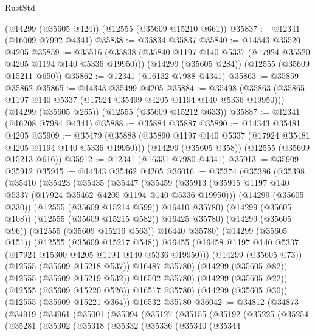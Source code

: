 \begin{lexlean}{RustStd}
\begin{coremodule}
    (@14299 (@35605 @424))
    (@12555 (@35609 @15210 @661))
@35837 := @12341 (@16009 @7992 @4341)
@35838 := @35834 @35837
@35840 := @14343 @35520 @4205
@35859 := @35516
    (@35838 (@35840 @1197 @140 @5337 (@17924 @35520 @4205 @1194 @140 @5336 @19950)))
    (@14299 (@35605 @284))
    (@12555 (@35609 @15211 @650))
@35862 := @12341 (@16132 @7988 @4341)
@35863 := @35859 @35862
@35865 := @14343 @35499 @4205
@35884 := @35498
    (@35863 (@35865 @1197 @140 @5337 (@17924 @35499 @4205 @1194 @140 @5336 @19950)))
    (@14299 (@35605 @265))
    (@12555 (@35609 @15212 @633))
@35887 := @12341 (@16208 @7984 @4341)
@35888 := @35884 @35887
@35890 := @14343 @35481 @4205
@35909 := @35479
    (@35888 (@35890 @1197 @140 @5337 (@17924 @35481 @4205 @1194 @140 @5336 @19950)))
    (@14299 (@35605 @358))
    (@12555 (@35609 @15213 @616))
@35912 := @12341 (@16331 @7980 @4341)
@35913 := @35909 @35912
@35915 := @14343 @35462 @4205
@36016 := @35374
    (@35386
      (@35398
        (@35410
          (@35423
            (@35435
              (@35447
                (@35459
                  (@35913 (@35915 @1197 @140 @5337 (@17924 @35462 @4205 @1194 @140 @5336 @19950)))
                  (@14299 (@35605 @330))
                  (@12555 (@35609 @15214 @599))
                  @16410
                  @35780)
                (@14299 (@35605 @108))
                (@12555 (@35609 @15215 @582))
                @16425
                @35780)
              (@14299 (@35605 @96))
              (@12555 (@35609 @15216 @563))
              @16440
              @35780)
            (@14299 (@35605 @151))
            (@12555 (@35609 @15217 @548))
            @16455
            (@16458 @1197 @140 @5337 (@17924 @15300 @4205 @1194 @140 @5336 @19950)))
          (@14299 (@35605 @73))
          (@12555 (@35609 @15218 @537))
          @16487
          @35780)
        (@14299 (@35605 @82))
        (@12555 (@35609 @15219 @532))
        @16502
        @35780)
      (@14299 (@35605 @22))
      (@12555 (@35609 @15220 @526))
      @16517
      @35780)
    (@14299 (@35605 @30))
    (@12555 (@35609 @15221 @364))
    @16532
    @35780
@36042 := @34812
    (@34873
      (@34919
        (@34961
          (@35001
            (@35094
              (@35127
                (@35155
                  (@35192
                    (@35225
                      (@35254
                        (@35281
                          (@35302
                            (@35318
                              (@35332
                                (@35336
                                  (@35340
                                    (@35344

\end{coremodule}
\end{lexlean}
